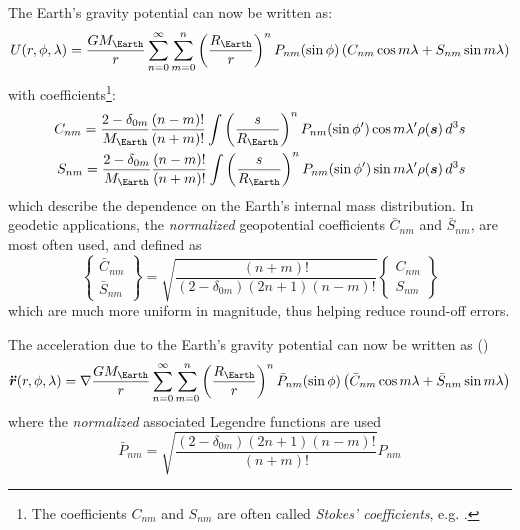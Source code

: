 The Earth's gravity potential can now be written as:
\begin{equation}\label{eq:mont310}
  U (r, \phi, \lambda ) = \frac{G M_{\Earth}}{r} \sum_{n=0}^{\infty} \sum_{m=0}^{n} 
      \left( \frac{R_{\Earth}}{r} \right) ^n P_{nm} (\sin \phi )
      \left( C_{nm} \cos {m\lambda} + S_{nm} \sin{m\lambda} \right)
\end{equation}
with coefficients\footnote{The coefficients $C_{nm}$ and $S_{nm}$ are often called 
\emph{Stokes' coefficients}, e.g. \cite{Barthelmes2018}.}:
\begin{equation}
  \begin{aligned}
    C_{nm} = \frac{2 - \delta _{0m}}{M_{\Earth}} \frac{(n-m)!}{(n+m)!} 
      \int \left({\frac{s}{R_{\Earth}}}\right)^n P_{nm} (\sin \phi ^\prime) \cos {m\lambda ^\prime} \rho (\bm{s}) \, d^3 s \\
    S_{nm} = \frac{2 - \delta _{0m}}{M_{\Earth}} \frac{(n-m)!}{(n+m)!} 
      \int \left({\frac{s}{R_{\Earth}}}\right)^n P_{nm} (\sin \phi ^\prime) \sin {m\lambda ^\prime} \rho (\bm{s}) \, d^3 s
  \end{aligned}
\end{equation}
which describe the dependence on the Earth's internal mass distribution. In geodetic 
applications, the \emph{normalized} geopotential coefficients $\bar{C}_{nm}$ and 
${\bar{S}}_{nm}$, are most often used, and defined as
\begin{equation}
  \begin{Bmatrix} \bar{C}_{nm} \\ \bar{S}_{nm} \end{Bmatrix} = 
  \sqrt{\frac{(n+m)!}{\left(2-\delta _{0m}\right) \left(2n+1\right) \left(n-m\right)!}}
  \begin{Bmatrix} C_{nm} \\ S_{nm} \end{Bmatrix}
\end{equation}
which are much more uniform in magnitude, thus helping reduce round-off errors.

The acceleration due to the Earth's gravity potential can now be written as  
(\cite{Montenbruck2000})
\begin{equation}\label{eq:mont315}
  \bm{\ddot{r}} (r, \phi, \lambda ) = \nabla \frac{GM_{\Earth}}{r} \sum_{n=0}^{\infty} \sum_{m=0}^{n} 
    \left(\frac{R_{\Earth}}{r}\right) ^n \bar{P}_{nm} (\sin \phi )
    \left( \bar{C}_{nm} \cos{m\lambda} + \bar{S}_{nm} \sin{m\lambda} \right)
\end{equation}
where the \emph{normalized} associated Legendre functions are used
\begin{equation}
  \bar{P}_{nm} = \sqrt{\frac{\left(2-\delta _{0m}\right) \left(2n+1\right) \left(n-m\right)!}{(n+m)!}} P_{nm}
\end{equation}

